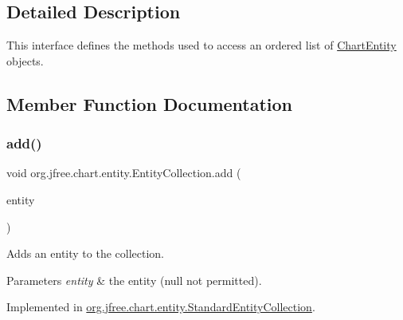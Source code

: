 \subsection{Detailed Description}
This interface defines the methods used to access an ordered list of \mbox{\hyperlink{classorg_1_1jfree_1_1chart_1_1entity_1_1_chart_entity}{Chart\+Entity}} objects. 

\subsection{Member Function Documentation}
\mbox{\label{interfaceorg_1_1jfree_1_1chart_1_1entity_1_1_entity_collection_adf370a130e27fabdb6785a82982f245b}} 
\subsubsection{\texorpdfstring{add()}{add()}}
{\footnotesize\ttfamily void org.\+jfree.\+chart.\+entity.\+Entity\+Collection.\+add (\begin{DoxyParamCaption}\item[{\mbox{\hyperlink{classorg_1_1jfree_1_1chart_1_1entity_1_1_chart_entity}{Chart\+Entity}}}]{entity }\end{DoxyParamCaption})}

Adds an entity to the collection.


\begin{DoxyParams}{Parameters}
{\em entity} & the entity ({\ttfamily null} not permitted). \\
\hline
\end{DoxyParams}


Implemented in \mbox{\hyperlink{classorg_1_1jfree_1_1chart_1_1entity_1_1_standard_entity_collection_a9a5df7e5ad5a7b41808b75b63f9aa0f6}{org.\+jfree.\+chart.\+entity.\+Standard\+Entity\+Collection}}.

\mbox{\label{interfaceorg_1_1jfree_1_1chart_1_1entity_1_1_entity_collection_a8085e4a67b6483c092a73b4298fd2193}} 
